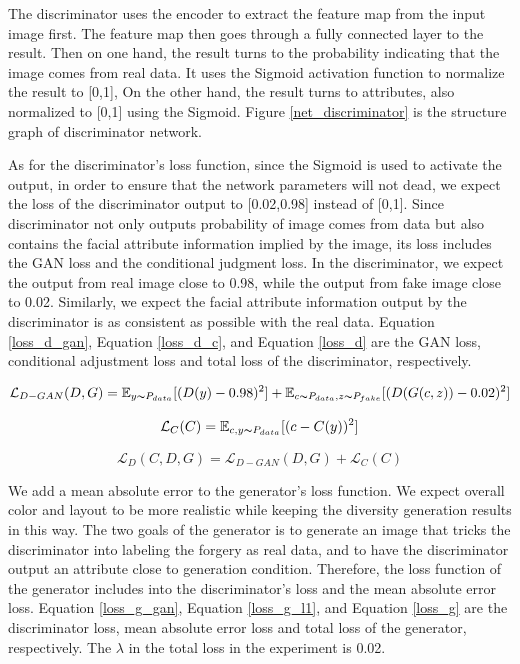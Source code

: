 The discriminator uses the encoder to extract the feature map from the input image first. The feature map then goes through a fully connected layer to the result.
Then on one hand,  the result turns to the probability indicating that the image comes from real data. It uses the Sigmoid activation function to normalize the result to [0,1],
On the other hand, the result turns to attributes, also normalized to [0,1] using the Sigmoid.
Figure \ref{net_discriminator} is the structure graph of discriminator network.

As for the discriminator's loss function, since the Sigmoid is used to activate the output,
    in order to ensure that the network parameters will not dead,
    we expect the loss of the discriminator output to [0.02,0.98] instead of [0,1].
Since discriminator not only outputs probability of image comes from data but also contains the facial attribute information implied by the image,
    its loss includes the GAN loss and the conditional judgment loss.
In the discriminator, we expect the output from real image close to 0.98, while the output from fake image close to 0.02.
Similarly, we expect the facial attribute information output by the discriminator is as consistent as possible with the real data.
Equation \eqref{loss_d_gan}, Equation \eqref{loss_d_c}, and Equation \eqref{loss_d} are the GAN loss,
    conditional adjustment loss and total loss of the discriminator, respectively.

\begin{equation}
    \mathcal{L}_{D-GAN}(D,G)=
    \mathbb{E}_{y\thicksim P_{data}}[(D(y)-0.98)^2]+
    \mathbb{E}_{c\thicksim P_{data},z\thicksim P_{fake}}[(D(G(c,z))-0.02)^2]
    \label{loss_d_gan}
\end{equation}


\begin{equation}
    \mathcal{L}_{C}(C)=
    \mathbb{E}_{c,y\thicksim P_{data}}[(c-C(y))^2]
    \label{loss_d_c}
\end{equation}

\begin{equation}
    \mathcal{L}_{D}(C,D,G)=
    \mathcal{L}_{D-GAN}(D,G)+
    \mathcal{L}_{C}(C)
    \label{loss_d}
\end{equation}

We add a mean absolute error to the generator's loss function.
We expect overall color and layout to be more realistic while keeping the diversity generation results in this way.
The two goals of the generator is to generate an image that tricks the discriminator into labeling the forgery as real data,
    and to have the discriminator output an attribute close to generation condition.
Therefore, the loss function of the generator includes into the discriminator's loss and the mean absolute error loss.
Equation \eqref{loss_g_gan}, Equation \eqref{loss_g_l1}, and Equation \eqref{loss_g} are the discriminator loss,
    mean absolute error loss and total loss of the generator, respectively.
The $\lambda$ in the total loss in the experiment is 0.02.

